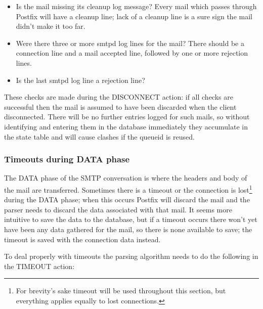 \documentclass[a4paper,12pt,draft]{article}
\begin{document}
\begin{itemize}

    \item Is the mail missing its cleanup log message?  Every mail which
        passes through Postfix will have a cleanup line; lack of a cleanup
        line is a sure sign the mail didn't make it too far.

    \item Were there three or more smtpd log lines for the mail?  There
        should be a connection line and a mail accepted line, followed by
        one or more rejection lines.

    \item Is the last smtpd log line a rejection line?

\end{itemize}

These checks are made during the DISCONNECT action: if all checks are
successful then the mail is assumed to have been discarded when the client
disconnected.  There will be no further entries logged for such mails, so
without identifying and entering them in the database immediately they
accumulate in the state table and will cause clashes if the queueid is
reused.

\subsubsection{Timeouts during DATA phase}

\label{timeouts-during-data-phase}

The DATA phase of the SMTP conversation is where the headers and body of the
mail are transferred.  Sometimes there is a timeout or the connection is
lost\footnote{For brevity's sake timeout will be used throughout this
section, but everything applies equally to lost connections.} during the
DATA phase; when this occurs Postfix will discard the mail and the parser
needs to discard the data associated with that mail.  It seems more
intuitive to save the data to the database, but if a timeout occurs there
won't yet have been any data gathered for the mail, so there is none
available to save; the timeout is saved with the connection data instead.

To deal properly with timeouts the parsing algorithm needs to do the
following in the TIMEOUT action:
\end{document}
